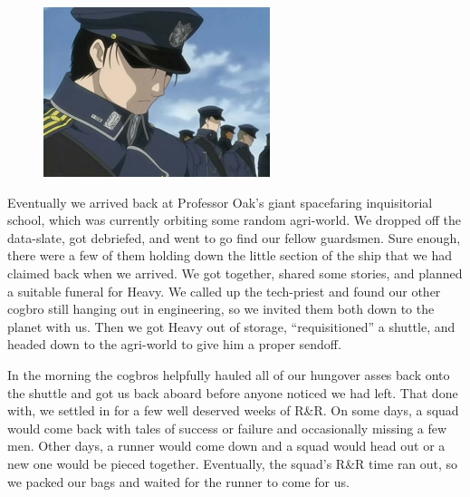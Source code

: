 \begin{figure}
\begin{center}
	\includegraphics[width=\figwidth]{pics/3/30.png}
\end{center}
\end{figure}
Eventually we arrived back at Professor Oak’s giant spacefaring inquisitorial school, which was currently orbiting some random agri-world. 
We dropped off the data-slate, got debriefed, and went to go find our fellow guardsmen. 
Sure enough, there were a few of them holding down the little section of the ship that we had claimed back when we arrived. 
We got together, shared some stories, and planned a suitable funeral for Heavy. 
We called up the tech-priest and found our other cogbro still hanging out in engineering, so we invited them both down to the planet with us. 
Then we got Heavy out of storage, “requisitioned” a shuttle, and headed down to the agri-world to give him a proper sendoff.

In the morning the cogbros helpfully hauled all of our hungover asses back onto the shuttle and got us back aboard before anyone noticed we had left. 
That done with, we settled in for a few well deserved weeks of R\&R. 
On some days, a squad would come back with tales of success or failure and occasionally missing a few men. 
Other days, a runner would come down and a squad would head out or a new one would be pieced together. 
Eventually, the squad’s R\&R time ran out, so we packed our bags and waited for the runner to come for us.

